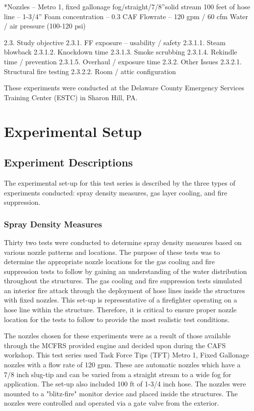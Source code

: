 \documentclass[12pt,oneside]{book}
\begin{document}
*Nozzles – Metro 1, fixed gallonage fog/straight/7/8”solid stream  
100 feet of hose line – 1-3/4”
Foam concentration – 0.3%
CAF Flowrate – 120 gpm / 60 cfm 
Water / air pressure (100-120 psi)

2.3. Study objective
2.3.1. FF exposure – usability / safety
2.3.1.1. Steam blowback
2.3.1.2. Knockdown time
2.3.1.3. Smoke scrubbing
2.3.1.4. Rekindle time / prevention
2.3.1.5. Overhaul / exposure time
2.3.2. Other Issues
2.3.2.1. Structural fire testing
2.3.2.2. Room / attic configuration

These experiments were conducted at the Delaware County Emergency Services Training Center (ESTC) in Sharon Hill, PA.  

\chapter{Experimental Setup}
\label{chap:Experimental_Setup}

\section{Experiment Descriptions}
\label{sec:Experiment_Descriptions}

The experimental set-up for this test series is described by the three types of experiments conducted: spray density measures, gas layer cooling, and fire suppression.

\subsection{Spray Density Measures}
\label{sec:Spray_Density_Measures}

Thirty two tests were conducted to determine spray density measures based on various nozzle patterns and locations. The purpose of these tests was to determine the appropriate nozzle locations for the gas cooling and fire suppression tests to follow by gaining an understanding of the water distribution throughout the structures. The gas cooling and fire suppression tests simulated an interior fire attack through the deployment of hose lines inside the structures with fixed nozzles. This set-up is representative of a firefighter operating on a hose line within the structure. Therefore, it is critical to ensure proper nozzle location for the tests to follow to provide the most realistic test conditions.     

The nozzles chosen for these experiments were as a result of those available through the MCFRS provided engine and decided upon during the CAFS workshop.  This test series used Task Force Tips (TFT) Metro 1, Fixed Gallonage nozzles with a flow rate of 120 gpm. These are automatic nozzles which have a 7/8 inch slug-tip and can be varied from a straight stream to a wide fog for application. The set-up also included 100 ft of 1-3/4 inch hose.  The nozzles were mounted to a "blitz-fire" monitor device and placed inside the structures.  The nozzles were controlled and operated via a gate valve from the exterior. 
\end{document}
